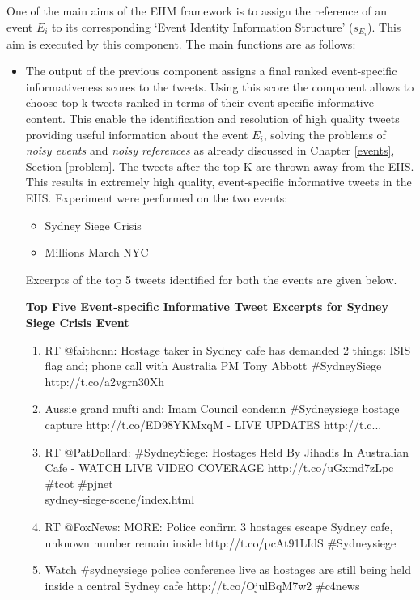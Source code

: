 One of the main aims of the EIIM framework is to assign the reference of an event $E_{i}$ to its corresponding `Event Identity Information Structure' ($s_{E_{i}}$). This aim is executed by this component. The main functions are as follows:

\begin{itemize}
\item The output of the previous component assigns a final ranked event-specific informativeness scores to the tweets. Using this score the component allows to choose top k tweets ranked in terms of their event-specific informative content. This enable the identification and resolution of high quality tweets providing useful information about the event $E_{i}$, solving the problems of \textit{noisy events} and \textit{noisy references} as already discussed in Chapter \ref{events}, Section \ref{problem}. The tweets after the top K are thrown away from the EIIS. This results in extremely high quality, event-specific informative tweets in the EIIS. Experiment were performed on the two events:

\begin{itemize}
\item Sydney Siege Crisis
\item Millions March NYC
\end{itemize}

Excerpts of the top 5 tweets identified for both the events are given below.

\textbf{Top Five Event-specific Informative Tweet Excerpts for Sydney Siege Crisis Event}
\begin{enumerate}
\item RT @faithcnn: Hostage taker in Sydney cafe has demanded 2 things: ISIS flag and; phone call with Australia PM Tony Abbott \#SydneySiege http://t.co/a2vgrn30Xh
\item Aussie grand mufti and; Imam Council condemn \#Sydneysiege hostage capture http://t.co/ED98YKMxqM - LIVE UPDATES http://t.c...
\item RT @PatDollard: \#SydneySiege: Hostages Held By Jihadis In Australian Cafe - WATCH LIVE VIDEO COVERAGE http://t.co/uGxmd7zLpc \#tcot \#pjnet \\ sydney-siege-scene/index.html
\item RT @FoxNews: MORE: Police confirm 3 hostages escape Sydney cafe, unknown number remain inside http://t.co/pcAt91LIdS \#Sydneysiege
\item Watch \#sydneysiege police conference live as hostages are still being held inside a central Sydney cafe http://t.co/OjulBqM7w2 \#c4news
\end{enumerate}


\end{itemize}

